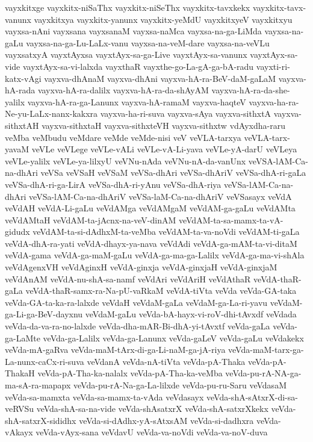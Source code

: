 {vayxkitxge
vayxkitx-niSaThx
vayxkitx-niSeThx
vayxkitx-tavxkekx
vayxkitx-tavx-vanunx
vayxkitxya
vayxkitx-yanunx
vayxkitx-yeMdU
vayxkitxyeV
vayxkitxyu
vayxsa-nAni
vayxsana
vayxsanaM
vayxsa-naMca
vayxsa-na-ga-LiMda
vayxsa-na-gaLu
vayxsa-na-ga-Lu-LaLx-vanu
vayxsa-na-veM-dare
vayxsa-na-veVLu
vayxsatxyA
vayxtAyxsa
vayxtAyx-sa-ga-Live
vayxtAyx-sa-vanunx
vayxtAyx-sa-vide
vayxtAyx-sa-vi-lalxda
vayxthaR
vayxthe-go-La-gA-ga-bA-radu
vayxti-ri-katx-vAgi
vayxva-dhAnaM
vayxva-dhAni
vayxva-hA-ra-BeV-daM-gaLaM
vayxva-hA-rada
vayxva-hA-ra-dalilx
vayxva-hA-ra-da-shAyAM
vayxva-hA-ra-da-she-yalilx
vayxva-hA-ra-ga-Lanunx
vayxva-hA-ramaM
vayxva-haqteV
vayxva-ha-ra-Ne-yu-LaLx-nanx-kakxra
vayxva-ha-ri-suva
vayxva-sAya
vayxva-sithxtA
vayxva-sithxtAH
vayxva-sithxtaH
vayxva-sithxteVH
vayxva-sithxtw
vdAyxdha-raru
veMba
veMbudu
veMdare
veMde
veMde-nisi
veV
veVLA-tarxya
veVLA-tarx-yavaM
veVLe
veVLege
veVLe-vALi
veVLe-vA-Li-yava
veVLe-yA-darU
veVLeya
veVLe-yalilx
veVLe-ya-lilxyU
veVNu-nAda
veVNu-nA-da-vanUnx
veVSA-lAM-Ca-na-dhAri
veVSa
veVSaH
veVSaM
veVSa-dhAri
veVSa-dhAriV
veVSa-dhA-ri-gaLa
veVSa-dhA-ri-ga-LirA
veVSa-dhA-ri-yAnu
veVSa-dhA-riya
veVSa-lAM-Ca-na-dhAri
veVSa-lAM-Ca-na-dhAriV
veVSa-laM-Ca-na-dhAriV
veVSasayx
veVdA
veVdAH
veVdA-Li-gaLu
veVdAMga
veVdAMgaM
veVdAM-ga-gaLu
veVdAMta
veVdAMtaH
veVdAM-ta-jAcnx-na-veV-dinAM
veVdAM-ta-sa-mamx-ta-vA-gidudx
veVdAM-ta-si-dAdhxM-ta-veMba
veVdAM-ta-va-noVdi
veVdAM-ti-gaLa
veVdA-dhA-ra-yati
veVdA-dhayx-ya-nava
veVdAdi
veVdA-ga-mAM-ta-vi-ditaM
veVdA-gama
veVdA-ga-maM-gaLu
veVdA-ga-ma-ga-Lalilx
veVdA-ga-ma-vi-shAla
veVdAgenxVH
veVdAginxH
veVdA-ginxja
veVdA-ginxjaH
veVdA-ginxjaM
veVdAnAM
veVdA-nu-shA-sa-namf
veVdAri
veVdAriH
veVdAthaR
veVdA-thaR-gaLa
veVdA-thaR-samx-ra-Na-pU-vaRkaM
veVdA-tiVta
veVda
veVda-GA-taka
veVda-GA-ta-ka-ra-lalxde
veVdaH
veVdaM-gaLa
veVdaM-ga-La-ri-yavu
veVdaM-ga-Li-ga-BeV-dayxnu
veVdaM-gaLu
veVda-bA-hayx-vi-roV-dhi-tAvxdf
veVdada
veVda-da-va-ra-no-lalxde
veVda-dha-mAR-Bi-dhA-yi-tAvxtf
veVda-gaLa
veVda-ga-LaMte
veVda-ga-Lalilx
veVda-ga-Lanunx
veVda-gaLeV
veVda-gaLu
veVdakekx
veVda-mA-gaRva
veVda-maM-tArx-di-ga-Li-naM-ga-jA-riya
veVda-maM-tarx-ga-La-nunx-caCx-ri-suva
veVdanA
veVda-nA-tiVta
veVda-pA-Thaka
veVda-pA-ThakaH
veVda-pA-Tha-ka-nalalx
veVda-pA-Tha-ka-veMba
veVda-pu-rA-NA-ga-ma-sA-ra-mapapx
veVda-pu-rA-Na-ga-La-lilxde
veVda-pu-ru-Saru
veVdasaM
veVda-sa-mamxta
veVda-sa-mamx-ta-vAda
veVdasayx
veVda-shA-sAtxrX-di-sa-veRVSu
veVda-shA-sa-na-vide
veVda-shAsatxrX
veVda-shA-satxrXkekx
veVda-shA-satxrX-sididhx
veVda-si-dAdhx-yA-sAtxsAM
veVda-si-dadhxra
veVda-vAkayx
veVda-vAyx-sana
veVdavU
veVda-va-noVdi
veVda-va-noV-duva
}
